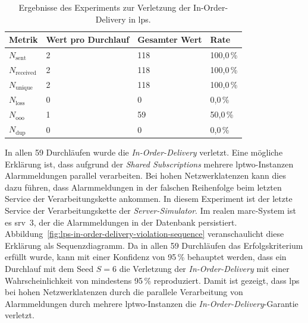 \begin{table}[H]
	\centering
	\caption{Ergebnisse des Experiments zur Verletzung der In-Order-Delivery in \acrshort{lps}.}
	\label{tab:exp-lps-iod-results}
	\begin{tabular}{|l|l|l|l|}
		\hline
		\textbf{Metrik}       & \textbf{Wert pro Durchlauf} & \textbf{Gesamter Wert} & \textbf{Rate} \\
		\hline
		$N_{\text{sent}}$     & 2                           & 118                    & 100{,}0\,\%   \\
		$N_{\text{received}}$ & 2                           & 118                    & 100{,}0\,\%   \\
		$N_{\text{unique}}$   & 2                           & 118                    & 100{,}0\,\%   \\
		$N_{\text{loss}}$     & 0                           & 0                      & 0{,}0\,\%     \\
		$N_{\text{ooo}}$      & 1                           & 59                     & 50{,}0\,\%    \\
		$N_{\text{dup}}$      & 0                           & 0                      & 0{,}0\,\%     \\
		\hline
	\end{tabular}
\end{table}

\newpage

In allen 59 Durchläufen wurde die \textit{In-Order-Delivery} verletzt. Eine mögliche Erklärung ist, dass aufgrund der \textit{Shared Subscriptions} mehrere \gls{lptwo}-Instanzen Alarmmeldungen parallel verarbeiten. Bei hohen Netzwerklatenzen kann dies dazu führen, dass Alarmmeldungen in der falschen Reihenfolge beim letzten Service der Verarbeitungskette ankommen. In diesem Experiment ist der letzte Service der Verarbeitungskette der \textit{Server-Simulator}. Im realen \gls{marc}-System ist es \gls{srv}~3, der die Alarmmeldungen in der Datenbank persistiert. Abbildung~\ref{fig:lps-in-order-delivery-violation-sequence} veranschaulicht diese Erklärung als Sequenzdiagramm. Da in allen 59 Durchläufen das Erfolgskriterium erfüllt wurde, kann mit einer Konfidenz von 95\,\% behauptet werden, dass ein Durchlauf mit dem Seed $S = 6$ die Verletzung der \textit{In-Order-Delivery} mit einer Wahrscheinlichkeit von mindestens 95\,\% reproduziert. Damit ist gezeigt, dass \gls{lps} bei hohen Netzwerklatenzen durch die parallele Verarbeitung von Alarmmeldungen durch mehrere \gls{lptwo}-Instanzen die \textit{In-Order-Delivery}-Garantie verletzt.

